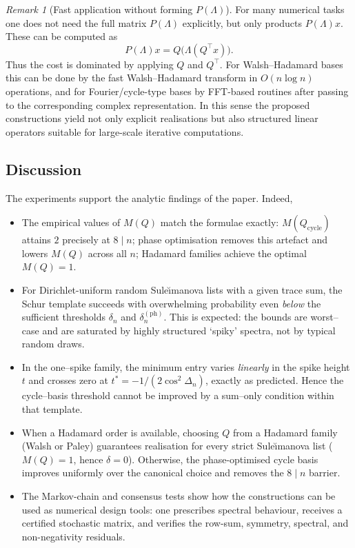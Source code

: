 \documentclass[12pt,fleqn]{amsart}
\theoremstyle{definition}
\theoremstyle{remark}
\newtheorem{rem}[thm]{Remark}
\newcommand{\1}{\mathbf{1}}
\begin{document}
\begin{rem}[Fast application without forming $P(\Lambda)$]
For many numerical tasks one does not need the full matrix $P(\Lambda)$ explicitly, but only products $P(\Lambda)x$. These can be computed as
\[
P(\Lambda)x = Q\bigl(\Lambda(Q^\top x)\bigr).
\]
Thus the cost is dominated by applying $Q$ and $Q^\top$. For Walsh--Hadamard bases this can be done by the fast Walsh--Hadamard transform in $O(n\log n)$ operations, and for Fourier/cycle-type bases by FFT-based routines after passing to the corresponding complex representation. In this sense the proposed constructions yield not only explicit realisations but also structured linear operators suitable for large-scale iterative computations.
\end{rem}



\subsection{Discussion}
The experiments support the analytic findings of the paper. Indeed,

\begin{itemize}
\item The empirical values of $M(Q)$ match the formulae exactly:
$M(Q_{\mathrm{cycle}})$ attains $2$ precisely at $8\mid n$; phase optimisation removes this
artefact and lowers $M(Q)$ across all $n$; Hadamard families achieve the optimal $M(Q)=1$.
\item For Dirichlet-uniform random Sule\u{\i}manova lists with a
given trace sum, the Schur template succeeds with overwhelming probability even
\emph{below} the sufficient thresholds $\delta_n$ and $\delta_n^{(\mathrm{ph})}$. This
is expected: the bounds are worst–case and are saturated by highly structured `spiky'
spectra, not by typical random draws.
\item In the one–spike family, the minimum entry varies
\emph{linearly} in the spike height $t$ and crosses zero at
$t^\ast=-1/(2\cos^2\Delta_n)$, exactly as predicted. Hence the cycle–basis threshold
cannot be improved by a sum–only condition within that template.
\item When a Hadamard order is available, choosing $Q$ from a
Hadamard family (Walsh or Paley) guarantees realisation for every strict
Sule\u{\i}manova list ($M(Q)=1$, hence $\delta=0$). Otherwise, the phase-optimised cycle basis
improves uniformly over the canonical choice and removes the $8\mid n$ barrier.
\item The Markov-chain and consensus tests show how the constructions can be used as numerical design tools: one prescribes spectral behaviour, receives a certified stochastic matrix, and verifies the row-sum, symmetry, spectral, and non-negativity residuals.
\end{itemize}
\end{document}
